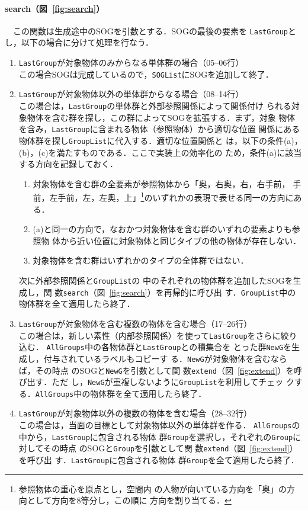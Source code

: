 \documentclass[japanese]{jnlp_1.2}
\def\extrel{}
\begin{document}
\paragraph{search（図~\ref{fig:search}）}
　この関数は生成途中のSOGを引数とする．SOGの最後の要素を
\texttt{LastGroup}とし，以下の場合に分けて処理を行なう．
\begin{enumerate}
\item \texttt{LastGroup}が対象物体のみからなる単体群の場合（05--06行）\\
  この場合SOGは完成しているので，\texttt{SOGList}にSOGを追加して終了．
\item \texttt{LastGroup}が対象物体以外の単体群からなる場合（08--14行）\\
  この場合は，\texttt{LastGroup}の単体群と外部参照関係によって関係付け
  られる対象物体を含む群を探し，この群によってSOGを拡張する．まず，対象
  物体を含み，\texttt{LastGroup}に含まれる物体（参照物体）から適切な位置
  関係にある物体群を探し\texttt{GroupList}に代入する．適切な位置関係と
  は，以下の条件(a)，(b)，(c)を満たすものである．ここで実装上の効率化の
  ため，条件(a)に該当する方向を記録しておく．
  \begin{enumerate}
  \item 対象物体を含む群の全要素が参照物体から「奥，右奥，右，右手前，
    手前，左手前，左，左奥，上」\footnote{参照物体の重心を原点とし，空間内
      の人物が向いている方向を「奥」の方向として方向を8等分し，この順に
      方向を割り当てる．}のいずれかの表現で表せる同一の方向にある．
  \item (a)と同一の方向で，なおかつ対象物体を含む群のいずれの要素よりも参照物
    体から近い位置に対象物体と同じタイプの他の物体が存在しない．
  \item 対象物体を含む群はいずれかのタイプの全体群ではない．
  \end{enumerate}
  次に外部参照関係{\extrel}と\texttt{GroupList}の
  中のそれぞれの物体群を追加したSOGを生成し，関
  数\texttt{search}（図~\ref{fig:search}）を再帰的に呼び出
  す．\texttt{GroupList}中の物体群を全て適用したら終了．
\item \texttt{LastGroup}が対象物体を含む複数の物体を含む場合（17--26行）\\
  この場合は，新しい素性（内部参照関係）を使って\texttt{LastGroup}をさらに絞り込む．
  \texttt{AllGroups}中の各物体群と\texttt{LastGroup}との積集合を
  とった群\texttt{NewG}を生成し，付与されているラベルもコピーす
  る．\texttt{NewG}が対象物体を含むならば，その時点
  のSOGと\texttt{NewG}を引数として関
  数\texttt{extend}（図~\ref{fig:extend}）を呼び出す．ただ
  し，\texttt{NewG}が重複しないように\texttt{GroupList}を利用してチェッ
  クする．\texttt{AllGroups}中の物体群を全て適用したら終了．
\item \texttt{LastGroup}が対象物体以外の複数の物体を含む場合（28--32行）\\
  この場合は，当面の目標として対象物体以外の単体群を作る．
  \texttt{AllGroups}の中から，\texttt{LastGroup}に包含される物体
  群\texttt{Group}を選択し，それぞれの\texttt{Group}に対してその時点
  のSOGと\texttt{Group}を引数として関
  数\texttt{extend}（図~\ref{fig:extend}）を呼び出
  す．\texttt{LastGroup}に包含される物体
  群\texttt{Group}を全て適用したら終了．
\end{enumerate}
\end{document}
